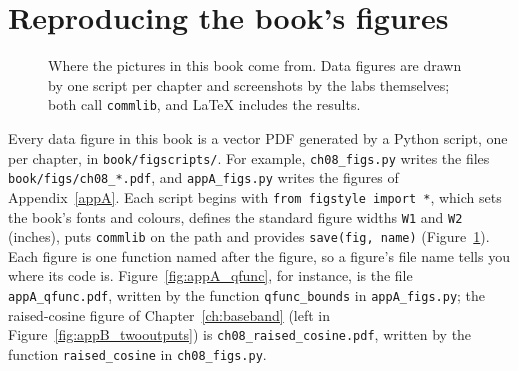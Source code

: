 \section{Reproducing the book's figures}
\label{sec:appB:figs}

\begin{figure}[htbp]\centering
{}
\caption{Where the pictures in this book come from. Data figures are drawn by one script per
chapter and screenshots by the labs themselves; both call \texttt{commlib}, and LaTeX includes the
results.}
\label{fig:appB_pipeline}
\end{figure}

\begin{sloppypar}
Every data figure in this book is a vector PDF generated by a Python script, one per chapter, in
\texttt{book/figscripts/}. For example, \texttt{ch08\_figs.py} writes the files
\texttt{book/figs/ch08\_*.pdf}, and \texttt{appA\_figs.py} writes the figures of Appendix~\ref{appA}. Each script begins with
\texttt{from figstyle import *}, which sets the book's fonts and colours, defines the standard figure
widths \texttt{W1} and \texttt{W2} (inches), puts \texttt{commlib} on the path and provides
\texttt{save(fig, name)} (Figure~\ref{fig:appB_pipeline}). Each figure is one function named after the figure, so a figure's file name
tells you where its code is. Figure~\ref{fig:appA_qfunc}, for instance, is the file
\texttt{appA\_qfunc.pdf}, written by the function \texttt{qfunc\_bounds} in \texttt{appA\_figs.py};
the raised-cosine figure of Chapter~\ref{ch:baseband} (left in Figure~\ref{fig:appB_twooutputs}) is
\texttt{ch08\_raised\_cosine.pdf}, written by the function \texttt{raised\_cosine} in
\texttt{ch08\_figs.py}.
\end{sloppypar}

